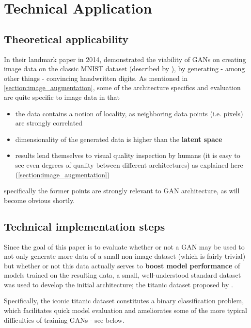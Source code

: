 \chapter{Technical Application}
\label{chapter:technical_application}

\section{Theoretical applicability}
\label{section:theory_application}

In their landmark paper in 2014, \cite{goodfellow2014generative} demonstrated the viability of \acp{GAN} on creating image data on the classic MNIST dataset (described by \cite{mnist}), by generating - among other things - convincing handwritten digits.
As mentioned in \ref{section:image_augmentation}, some of the architecture specifics and evaluation are quite specific to image data in that 

\begin{itemize}
	\item the data contains a notion of locality, as neighboring data points (i.e. pixels) are strongly correlated
	\item dimensionality of the generated data is higher than the \textbf{latent space} 
	\item results lend themselves to visual quality inspection by humans (it is easy to see even degrees of quality between different architectures) as explained here (\ref{section:image_augmentation})
\end{itemize}

specifically the former points are strongly relevant to \ac{GAN} architecture, as will become obvious shortly.

\section{Technical implementation steps}
\label{section:technical_implementation}

Since the goal of this paper is to evaluate whether or not a \ac{GAN} may be used to not only generate more data of a small non-image dataset (which is fairly trivial) but whether or not this data actually serves to \textbf{boost model performance} of models trained on the resulting data, a small, well-understood standard dataset was used to develop the initial architecture; the titanic dataset proposed by \cite{titanic}.

Specifically, the iconic titanic dataset constitutes a binary classification problem, which facilitates quick model evaluation and ameliorates some of the more typical difficulties of training \acp{GAN} - see below.

